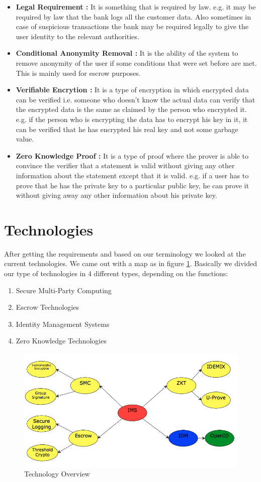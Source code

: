 \begin{itemize}
\item\textbf{Legal Requirement :}
It is something that is required by law. e.g. it may be required by law that the bank logs all the customer data. Also sometimes in case of suspicious transactions the bank may be required legally to give the user identity to the relevant authorities.
\item\textbf{Conditional Anonymity Removal :}
It is the ability of the system to remove anonymity of the user if some conditions that were set before are met. This is mainly used for escrow purposes.
\item\textbf{Verifiable Encrytion :}
It is a type of encryption in which encrypted data can be verified i.e. someone who doesn't know the actual data can verify that the encrypted data is the same as claimed by the person who encrypted it. e.g. if the person who is encrypting the data has to encrypt his key in it, it can be verified that he has encrypted his real key and not some garbage value.
\item\textbf{Zero Knowledge Proof :}
It is a type of proof where the prover is able to convince the verifier that a statement is valid without giving any other information about the statement except that it is valid. e.g. if a user has to prove that he has the private key to a particular public key, he can prove it without giving away any other information about his private key.
\end{itemize}
\section{Technologies}
After getting the requirements and based on our terminology we looked at the current technologies. We came out with a map as in figure \ref{fig:Technologies}. Basically we divided our type of technologies in 4 different types, depending on the functions:
\begin{enumerate}
	\item Secure Multi-Party Computing
	\item Escrow Technologies
	\item Identity Management Systems
	\item Zero Knowledge Technologies
\end{enumerate}
\begin{figure}[h]
	\centering
	\includegraphics[width=\textwidth]{figures/Technologies}
	\caption{Technology Overview}
	\label{fig:Technologies}
\end{figure}
